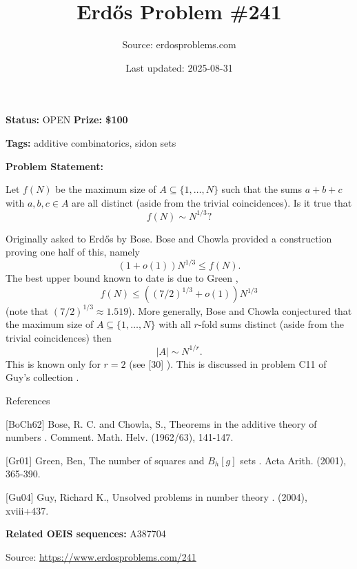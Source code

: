 \documentclass{article}
\title{Erd\H{o}s Problem \#241}
\date{Last updated: 2025-08-31}
\author{Source: erdosproblems.com}
\begin{document}
\maketitle

\noindent\textbf{Status:} OPEN \quad \textbf{Prize: \$100}

\noindent\textbf{Tags:} additive combinatorics, sidon sets

\medskip

\noindent\textbf{Problem Statement:}

Let $f(N)$ be the maximum size of $A\subseteq \{1,\ldots,N\}$ such that the sums $a+b+c$ with $a,b,c\in A$ are all distinct (aside from the trivial coincidences). Is it true that\[ f(N)\sim N^{1/3}?\]




Originally asked to Erd\H{o}s by Bose. Bose and Chowla \cite{BoCh62} provided a construction proving one half of this, namely\[(1+o(1))N^{1/3}\leq f(N).\]The best upper bound known to date is due to Green \cite{Gr01},\[f(N) \leq ((7/2)^{1/3}+o(1))N^{1/3}\](note that $(7/2)^{1/3}\approx 1.519$). More generally, Bose and Chowla conjectured that the maximum size of $A\subseteq \{1,\ldots,N\}$ with all $r$-fold sums distinct (aside from the trivial coincidences) then\[\lvert A\rvert \sim N^{1/r}.\]This is known only for $r=2$ (see [30] ). This is discussed in problem C11 of Guy's collection \cite{Gu04}.




References

[BoCh62] Bose, R. C. and Chowla, S., Theorems in the additive theory of numbers . Comment. Math. Helv. (1962/63), 141-147.

[Gr01] Green, Ben, The number of squares and {$B_h[g]$} sets . Acta Arith. (2001), 365-390.

[Gu04] Guy, Richard K., Unsolved problems in number theory . (2004), xviii+437.

\noindent\textbf{Related OEIS sequences:} A387704


\bigskip
\noindent\small{Source: \url{https://www.erdosproblems.com/241}}
\end{document}

